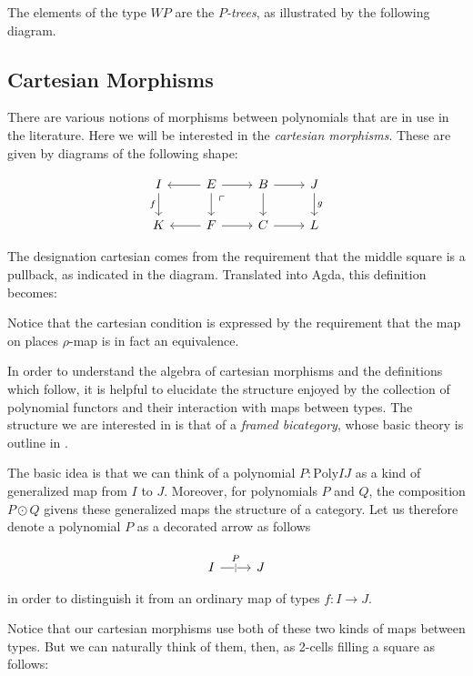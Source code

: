 \documentclass{article}
\newcommand{\snippet}[1]{\ExecuteMetaData[latex/opetopes.tex]{#1}}
\newcommand{\pbmark}{\ar[dr, phantom, "\ulcorner" very near start, shift right=1ex]}
\newcommand{\Poly}{\mathrm{Poly}}
\begin{document}
The elements of the type $W P$ are the \emph{$P$-trees}, as
illustrated by the following diagram.

\subsection{Cartesian Morphisms}

There are various notions of morphisms between polynomials
that are in use in the literature.  Here we will be interested
in the \emph{cartesian morphisms}.  These are given by diagrams
of the following shape:

\[
\begin{tikzcd}
  I \ar[d, "f"'] & E \ar[l] \ar[r] \ar[d] \pbmark & B \ar[r] \ar[d] & J \ar[d, "g"] \\
  K & F \ar[l] \ar[r] & C \ar[r] & L
\end{tikzcd}
\]

The designation cartesian comes from the requirement that the middle
square is a pullback, as indicated in the diagram.  Translated into
Agda, this definition becomes:

\snippet{cartmorph}

\noindent Notice that the cartesian condition is expressed by the
requirement that the map on places $\rho$-map is in fact an equivalence.

In order to understand the algebra of cartesian morphisms and the
definitions which follow, it is helpful to elucidate the structure
enjoyed by the collection of polynomial functors and their interaction
with maps between types.  The structure we are interested in is that
of a \emph{framed bicategory}, whose basic theory is outline in \cite{S07}.

The basic idea is that we can think of a polynomial $P : \Poly I J$ as
a kind of generalized map from $I$ to $J$.  Moreover, for polynomials
$P$ and $Q$, the composition $P \odot Q$ givens these generalized maps
the structure of a category.  Let us therefore denote a polynomial $P$
as a decorated arrow as follows

\[
\begin{tikzcd}
  I \arrow{r}[description, inner sep=0pt]{|}[inner sep=5pt]{P} & J 
\end{tikzcd}
\]

\noindent in order to distinguish it from an ordinary map of types
$f : I \to J$.

Notice that our cartesian morphisms use both of these two kinds of
maps between types.  But we can naturally think of them, then, as
2-cells filling a square as follows:
\end{document}
